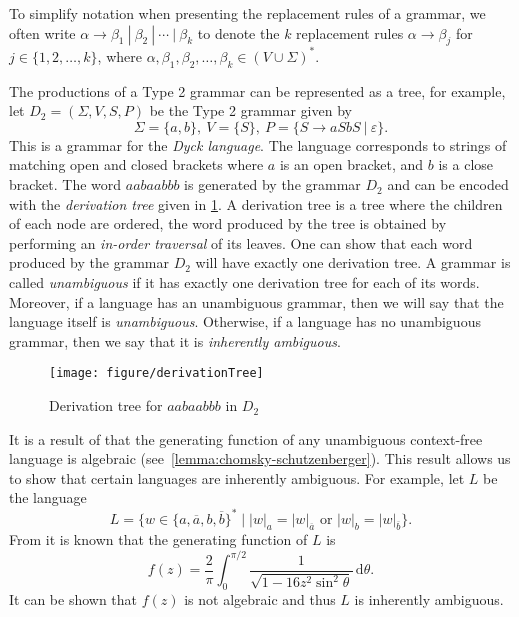\begin{notation}
To simplify notation when presenting the replacement rules of a grammar, we often write $\alpha \to \beta_1\ |\ \beta_2\ |\ \cdots\ |\ \beta_k$ to denote the $k$ replacement rules $\alpha \to \beta_j$ for $j \in \{1,2,\ldots,k\}$, where $\alpha,\beta_1,\beta_2,\ldots,\beta_k \in (V \cup \Sigma)^*$.
\end{notation}

The productions of a Type 2 grammar can be represented as a tree, for example, let $D_2 = (\Sigma, V, S, P)$ be the Type 2 grammar given by
\[
	\Sigma = \{a,b\},\ 
	V = \{S\},\ 
	P=
	\{
		S \to aSbS\ |\ \varepsilon
	\}.
\]
This is a grammar for the \emph{Dyck language}.
The language corresponds to strings of matching open and closed brackets where $a$ is an open bracket, and $b$ is a close bracket.
The word $aabaabbb$ is generated by the grammar $D_2$ and  can be encoded with the \emph{derivation tree} given in \cref{fig:dyck-language}.
A derivation tree is a tree where the children of each node are ordered, the word produced by the tree is obtained by performing an \emph{in-order traversal} of its leaves.
One can show that each word produced by the grammar $D_2$ will have exactly one derivation tree.
A grammar is called \emph{unambiguous} if it has exactly one derivation tree for each of its words.
Moreover, if a language has an unambiguous grammar, then we will say that the language itself is \emph{unambiguous}.
Otherwise, if a language has no unambiguous grammar, then we say that it is \emph{inherently ambiguous}.

\begin{figure}[h]
	\centering
	\texttt{[image: figure/derivationTree]}
	\caption{Derivation tree for $aabaabbb$ in $D_2$}%
	\label{fig:dyck-language}
\end{figure}

It is a result of \citeauthor{chomsky1963} that the generating function of any unambiguous context-free language is algebraic (see~\cref{lemma:chomsky-schutzenberger}).
This result allows us to show that certain languages are inherently ambiguous.
For example, let $L$ be the language
\[
	L
	=
	\{
		w \in \{a, \overline{a}, b, \overline{b}\}^*
	\mid
		|w|_{a} = |w|_{\overline{a}}
		\text{ or }
		|w|_{b} = |w|_{\overline{b}}
	\}.
\]
From \cite[296]{flajolet1987} it is known that the generating function of $L$ is
\[
	f(z)
	=
	\frac{2}{\pi}
	\int_{0}^{\pi/2}
		\frac{1}{
			\sqrt{1-16z^2 \sin^2\theta}} \,\mathrm{d} \theta.
\]
It can be shown that $f(z)$ is not algebraic and thus $L$ is inherently ambiguous.

